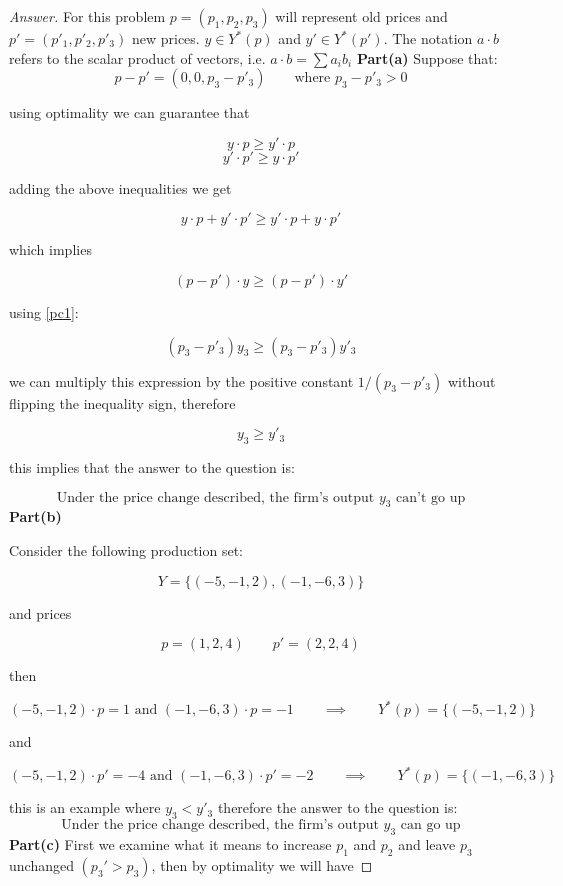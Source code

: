 \documentclass{article}
\theoremstyle{definition}
\newcommand{\qiq}{\qquad \implies \qquad}
\begin{document}
\begin{proof}[Answer]
For this problem $p=(p_1, p_2, p_3)$  will represent old prices and $p'=(p'_1, p'_2, p'_3)$ new prices. $y\in Y^*(p)$ and $y'\in Y^*(p')$. The notation $a \cdot b$ refers to the scalar product of vectors, i.e.  $a \cdot b = \sum{a_ib_i}$
\newline
\newline
\textbf{Part(a)}
Suppose that:
\begin{equation}\label{pc1}
 p - p' = (0,0,p_3-p'_3) \qquad \text{where } p_3-p'_3>0    
\end{equation}
 
using optimality  we can guarantee that

$$y\cdot p \geq y'\cdot p$$
$$y' \cdot p' \geq y\cdot p'$$

adding the above inequalities we get

$$y\cdot p + y' \cdot p' \geq y'\cdot p  + y\cdot p'$$

which implies

$$(p-p')\cdot y \geq (p-p')\cdot y'$$

using \eqref{pc1}:

$$(p_3-p'_3)y_3 \geq (p_3-p'_3)y'_3$$

we can multiply this expression by the positive constant $1/(p_3-p'_3)$ without flipping  the inequality sign, therefore

$$y_3 \geq y'_3$$

this implies that the answer to the question is:

$$\boxed{\text{Under the price change described, the firm's output } y_{3}\text{ can't go up}}$$
\newline
\newline
\textbf{Part(b)}

Consider the following production set:

$$Y = \{(-5,-1,2), (-1,-6,3)\}$$

and prices

$$p=(1,2,4) \qquad p'=(2,2,4)$$

then

$$(-5,-1,2)\cdot p = 1 \text{ and } (-1,-6,3)\cdot p = -1 \qiq Y^*(p) = \{(-5,-1,2)\}$$

and

$$(-5,-1,2)\cdot p' = -4 \text{ and } (-1,-6,3)\cdot p' = -2 \qiq Y^*(p) = \{(-1,-6,3)\}$$

this is an example where $y_3<y'_3$ therefore the answer to the question is:
$$\boxed{\text{Under the price change described, the firm's output } y_{3}\text{ can go up}}$$
\newline
\newline
\textbf{Part(c)}
First we examine what it means to increase $p_1$ and $p_2$ and leave $p_3$ unchanged $(p_3'>p_3)$, then by optimality we will have


\end{proof}
\end{document}
